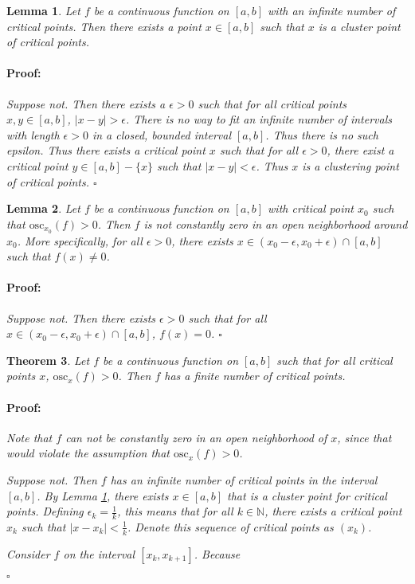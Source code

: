 \documentclass{article}
\newenvironment{proof}{\paragraph{Proof:}}{\hfill$\square$}
\newtheorem{theorem}{Theorem}
\newtheorem{lemma}[theorem]{Lemma}
\newcommand{\N}{\mathbb{N}}
\newcommand{\osc}{\text{osc}}
\begin{document}
\begin{lemma}
\label{InfiniteCriticalImpliesCluster}
Let $f$ be a continuous function on $[a, b]$ with an infinite number of critical points. Then there exists a point $x \in [a, b]$ such that $x$ is a cluster point of critical points.
\begin{proof}
Suppose not. Then there exists a $\epsilon > 0$ such that for all critical points $x, y \in [a, b]$, $|x - y| > \epsilon$. There is no way to fit an infinite number of intervals with length $\epsilon > 0$ in a closed, bounded interval $[a, b]$. Thus there is no such epsilon. Thus there exists a critical point $x$ such that for all $\epsilon > 0$, there exist a critical point $y \in [a, b] - \{x\}$ such that $|x - y| < \epsilon$. Thus $x$ is a clustering point of critical points.
\end{proof}
\end{lemma}

\begin{lemma}
Let $f$ be a continuous function on $[a, b]$ with critical point $x_0$ such that $\osc_{x_0}(f) > 0$. Then $f$ is not constantly zero in an open neighborhood around $x_0$. More specifically, for all $\epsilon > 0$, there exists $x \in (x_0 - \epsilon, x_0 + \epsilon) \cap [a, b]$ such that $f(x) \neq 0$.
\begin{proof}
Suppose not. Then there exists $\epsilon > 0$ such that for all $x \in (x_0 - \epsilon, x_0 + \epsilon) \cap [a, b]$, $f(x) = 0$. 
\end{proof}
\end{lemma}

\begin{theorem}
Let $f$ be a continuous function on $[a, b]$ such that for all critical points $x$, $\osc_x(f) > 0$. Then $f$ has a finite number of critical points.
\begin{proof}
Note that $f$ can not be constantly zero in an open neighborhood of $x$, since that would violate the assumption that $\osc_x(f) > 0$.

Suppose not. Then $f$ has an infinite number of critical points in the interval $[a, b]$. By Lemma \ref{InfiniteCriticalImpliesCluster}, there exists $x \in [a, b]$ that is a cluster point for critical points. Defining $\epsilon_k = \frac{1}{k}$, this means that for all $k \in \N$, there exists a critical point $x_k$ such that $|x - x_k| < \frac{1}{k}$. Denote this sequence of critical points as $(x_k)$.

Consider $f$ on the interval $[x_k, x_{k+1}]$. Because

\end{proof}
\end{theorem}
\end{document}
